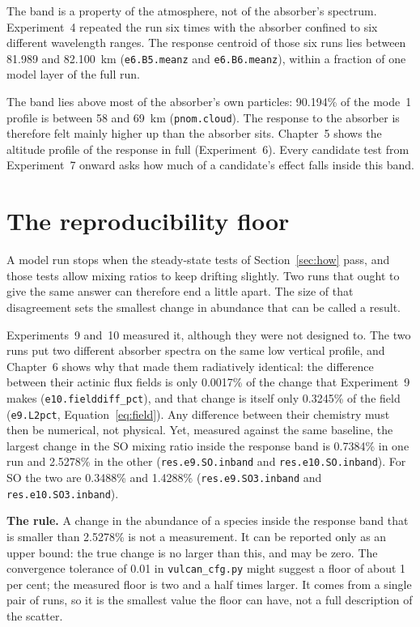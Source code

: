 The band is a property of the atmosphere, not of the absorber's spectrum. Experiment~4
repeated the run six times with the absorber confined to six different wavelength
ranges. The response centroid of those six runs lies between 81.989 and 82.100~km
(\texttt{e6.B5.meanz} and \texttt{e6.B6.meanz}), within a fraction of one model layer of
the full run.

The band lies above most of the absorber's own particles: 90.194\% of the mode~1
profile is between 58 and 69~km (\texttt{pnom.cloud}). The response to the absorber is
therefore felt mainly higher up than the absorber sits. Chapter~5 shows the altitude
profile of the response in full (Experiment~6). Every candidate test from Experiment~7
onward asks how much of a candidate's effect falls inside this band.

\section{The reproducibility floor}
\label{sec:conv-floor}

A model run stops when the steady-state tests of Section~\ref{sec:how} pass, and those
tests allow mixing ratios to keep drifting slightly. Two runs that ought to give the same
answer can therefore end a little apart. The size of that disagreement sets the
smallest change in abundance that can be called a result.

Experiments~9 and~10 measured it, although they were not designed to. The two runs put
two different absorber spectra on the same low vertical profile, and Chapter~6 shows why
that made them radiatively identical: the difference between their actinic flux fields
is only 0.0017\% of the change that Experiment~9 makes (\texttt{e10.fielddiff\_pct}),
and that change is itself only 0.3245\% of the field (\texttt{e9.L2pct},
Equation~\eqref{eq:field}). Any difference between their chemistry must then be
numerical, not physical. Yet, measured against the same baseline, the largest change in
the SO mixing ratio inside the response band is 0.7384\% in one run and 2.5278\% in the
other (\texttt{res.e9.SO.inband} and \texttt{res.e10.SO.inband}). For SO the two
are 0.3488\% and 1.4288\% (\texttt{res.e9.SO3.inband} and \texttt{res.e10.SO3.inband}).

\textbf{The rule.} A change in the abundance of a species inside the response band that
is smaller than 2.5278\% is not a measurement. It can be reported only as an upper bound:
the true change is no larger than this, and may be zero. The convergence tolerance of
0.01 in \texttt{vulcan\_cfg.py} might suggest a floor of about 1 per cent; the measured floor is two and a half times larger. It comes from a single pair of runs, so
it is the smallest value the floor can have, not a full description of the scatter.

